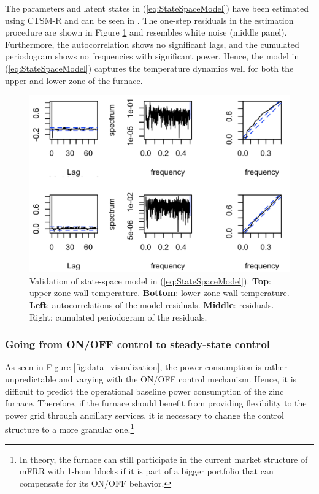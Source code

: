 \documentclass[lettersize,journal]{IEEEtran}
\begin{document}
The parameters and latent states in (\ref{eq:StateSpaceModel}) have been estimated using CTSM-R \cite{juhl2016ctsmr} and can be seen in \cite{code}. The one-step residuals in the estimation procedure are shown in Figure \ref{fig:4thOrderModelValidation} and resembles white noise (middle panel). Furthermore, the autocorrelation shows no significant lags, and the cumulated periodogram shows no frequencies with significant power. Hence, the model in (\ref{eq:StateSpaceModel}) captures the temperature dynamics well for both the upper and lower zone of the furnace.


\begin{figure}[t]
    \centering
    \includegraphics[width=\columnwidth]{figures/4thOrderModelValidation_V2.png}
    \caption{Validation of state-space model in (\ref{eq:StateSpaceModel}). \textbf{Top}: upper zone wall temperature. \textbf{Bottom}: lower zone wall temperature. \textbf{Left}: autocorrelations of the model residuals. \textbf{Middle}: residuals. \textrm{Right}: cumulated periodogram of the residuals.}
    \label{fig:4thOrderModelValidation}
\end{figure}


\subsubsection{Going from ON/OFF control to steady-state control}

As seen in Figure \ref{fig:data_visualization}, the power consumption is rather unpredictable and varying with the ON/OFF control mechanism. Hence, it is difficult to predict the operational baseline power consumption of the zinc furnace. Therefore, if the furnace should benefit from providing flexibility to the power grid through ancillary services, it is necessary to change the control structure to a more granular one.\footnote{In theory, the furnace can still participate in the current market structure of mFRR with 1-hour blocks if it is part of a bigger portfolio that can compensate for its ON/OFF behavior.}
\end{document}
